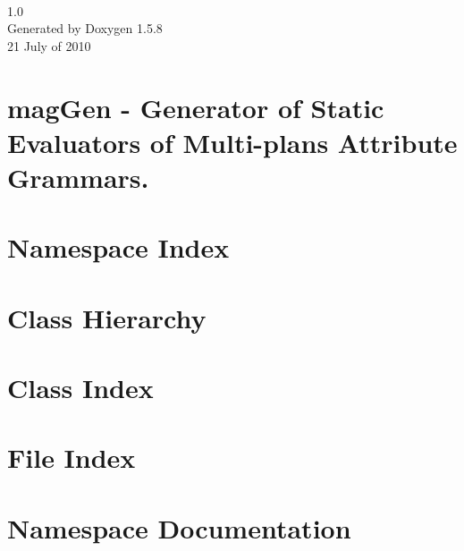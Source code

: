 \documentclass[a4paper,11pt]{book}
\begin{document}
\begin{titlepage}
\vspace*{7cm}
\begin{center}
{\Huge \textbf{\textit{}} \\[1ex]\large 1.0 }\\
\vspace*{1cm}
{\large Generated by Doxygen 1.5.8}\\
\vspace*{0.5cm}
{\small{21 July of 2010}}

\end{center}
\end{titlepage}
\clearemptydoublepage
{}
\tableofcontents
\clearemptydoublepage
{}
\chapter{magGen - Generator of Static Evaluators of Multi-plans Attribute Grammars.}
\label{index}\hypertarget{index}{}
\chapter{Namespace Index}

\chapter{Class Hierarchy}

\chapter{Class Index}

\chapter{File Index}

\chapter{Namespace Documentation}


\end{document}
